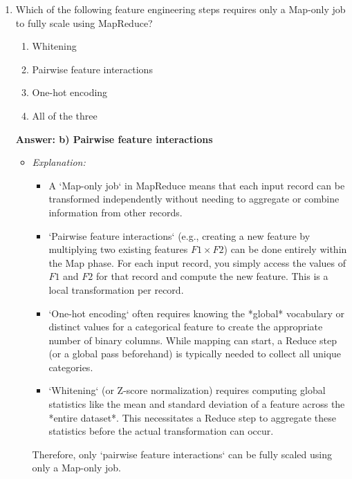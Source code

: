 \documentclass{article}
\begin{document}
\begin{enumerate}[label=\textbf{Question \arabic*.}]
\item Which of the following feature engineering steps requires only a Map-only job to fully scale using MapReduce?
    \begin{enumerate}[label=\alph*)]
        \item Whitening
        \item Pairwise feature interactions
        \item One-hot encoding
        \item All of the three
    \end{enumerate}
    \textbf{Answer: b) Pairwise feature interactions}
    \begin{itemize}
        \item \textit{Explanation:}
        \begin{itemize}
            \item A `Map-only job` in MapReduce means that each input record can be transformed independently without needing to aggregate or combine information from other records.
            \item `Pairwise feature interactions` (e.g., creating a new feature by multiplying two existing features $F1 \times F2$) can be done entirely within the Map phase. For each input record, you simply access the values of $F1$ and $F2$ for that record and compute the new feature. This is a local transformation per record.
            \item `One-hot encoding` often requires knowing the *global* vocabulary or distinct values for a categorical feature to create the appropriate number of binary columns. While mapping can start, a Reduce step (or a global pass beforehand) is typically needed to collect all unique categories.
            \item `Whitening` (or Z-score normalization) requires computing global statistics like the mean and standard deviation of a feature across the *entire dataset*. This necessitates a Reduce step to aggregate these statistics before the actual transformation can occur.
        \end{itemize}
        Therefore, only `pairwise feature interactions` can be fully scaled using only a Map-only job.
    \end{itemize}


\end{enumerate}
\end{document}

